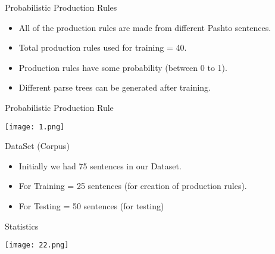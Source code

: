 \documentclass{beamer}
\begin{document}
\begin{frame}{Probabilistic Production Rules}
	\begin{itemize}
	\item  All of the production rules are made from different Pashto sentences. \\
	\vspace{1em}
	\item  Total production rules used for training = 40. \\
	\vspace{1em}
	\item  Production rules have some probability (between 0 to 1).  \\
	\vspace{1em} 
	\item  Different parse trees can be generated after training. \\
	\vspace{1em}
	\end{itemize}
\end{frame}



\begin{frame}{Probabilistic Production Rule}
\begin{center}
	\texttt{[image: 1.png]}	
\end{center}
\end{frame}




\begin{frame}{DataSet (Corpus)}
\begin{itemize}
	\item Initially we had 75 sentences in our Dataset.
	\vspace{1em}
	\item For Training = 25 sentences (for creation of production rules).
	\item For Testing = 50 sentences (for testing)
	\vspace{1em} 
	
\end{itemize}
\end{frame}



\begin{frame}{Statistics}
\begin{center}
	\texttt{[image: 22.png]}	
\end{center}
\end{frame}
\end{document}

